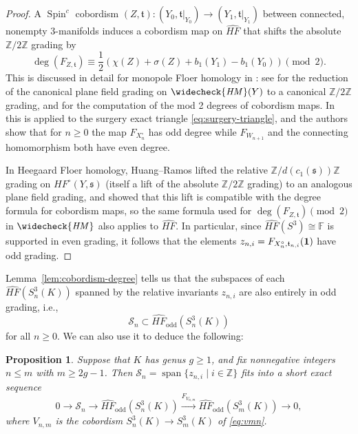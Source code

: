\documentclass[11pt]{amsart}
\newtheorem {proposition}[theorem]{Proposition}
\numberwithin{equation}{section}
\numberwithin{theorem}{section}
\theoremstyle{definition}
\newcommand{\Z}{\mathbb{Z}}
\newcommand{\F}{\mathbb{F}}
\newcommand{\spc}{\operatorname{Spin}^c}
\newcommand{\spinc}{\mathfrak{s}}
\newcommand{\spint}{\mathfrak{t}}
\newcommand{\cS}{\mathcal{S}}
\DeclareMathOperator{\Span}{span}
\newcommand\hf{\mathit{HF}}
\newcommand{\HMto}{\widecheck{\mathit{HM}}}
\newcommand{\hfhat}{\widehat{\mathit{HF}}}
\newcommand{\godd}{\mathrm{odd}}
\begin{document}
\begin{proof}
A $\spc$ cobordism $(Z,\spint): (Y_0,\spint|_{Y_0}) \to (Y_1,\spint|_{Y_1})$ between connected, nonempty 3-manifolds induces a cobordism map on $\hfhat$ that shifts the absolute $\Z/2\Z$ grading by
\[ \deg(F_{Z,\spint}) \equiv \frac{1}{2}(\chi(Z)+\sigma(Z) + b_1(Y_1)-b_1(Y_0)) \pmod{2}. \]
This is discussed in detail for monopole Floer homology in \cite{km-book}: see \cite[\S22.4]{km-book} for the reduction of the canonical plane field grading on $\HMto(Y)$ to a canonical $\Z/2\Z$ grading, and \cite[\S25.4]{km-book} for the computation of the mod 2 degrees of cobordism maps.  In \cite[\S42.3]{km-book} this is applied to the surgery exact triangle \eqref{eq:surgery-triangle}, and the authors show that for $n\geq 0$ the map $F_{X^\circ_n}$ has odd degree while $F_{W_{n+1}}$ and the connecting homomorphism both have even degree.

In Heegaard Floer homology, Huang--Ramos \cite{huang-ramos} lifted the relative $\Z/d(c_1(\spinc))\Z$ grading on $\hf^\circ(Y,\spinc)$ (itself a lift of the absolute $\Z/2\Z$ grading) to an analogous plane field grading, and showed that this lift is compatible with the degree formula for cobordism maps, so the same formula used for $\deg(F_{Z,\spint}) \pmod{2}$ in $\HMto$ also applies to $\hfhat$.  In particular, since $\hfhat(S^3) \cong \F$ is supported in even grading, it follows that the elements $z_{n,i} = F_{X^\circ_n,\spint_{n,i}}({\bf 1})$ have odd grading.
\end{proof}

Lemma~\ref{lem:cobordism-degree} tells us that the subspaces of each $\hfhat(S^3_n(K))$ spanned by the relative invariants $z_{n,i}$ are also entirely in odd grading, i.e.,
\[ \cS_n \subset \hfhat_\godd(S^3_n(K)) \]
for all $n \geq 0$.  We can also use it to deduce the following:

\begin{proposition} \label{prop:large-odd-span}
Suppose that $K$ has genus $g \geq 1$, and fix nonnegative integers $n \leq m$ with $m \geq 2g-1$.  Then $\cS_n = \Span \{z_{n,i} \mid i\in\Z\}$ fits into a short exact sequence
\[ 0 \to \cS_n \to \hfhat_\godd(S^3_n(K)) \xrightarrow{F_{V_{n,m}}} \hfhat_\godd(S^3_m(K)) \to 0, \]
where $V_{n,m}$ is the cobordism $S^3_n(K) \to S^3_m(K)$ of \eqref{eq:vmn}.
\end{proposition}
\end{document}
